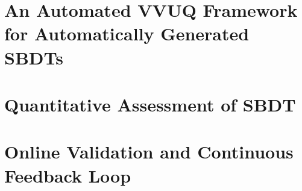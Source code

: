 \section{An Automated VVUQ Framework for Automatically Generated SBDTs}
\label{sec:framework}

\section{Quantitative Assessment of SBDT}
\label{sec:metrics}

\section{Online Validation and Continuous Feedback Loop}
\label{sec:online-validation}
